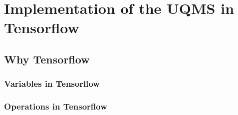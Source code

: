 \chapter{Implementation of the UQMS in Tensorflow}\label{cap_tensorflow}

\section{Why Tensorflow}

\subsection{Variables in Tensorflow}

\subsection{Operations in Tensorflow}
